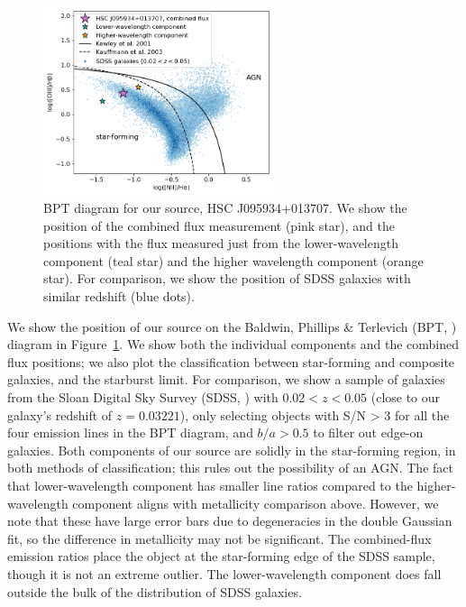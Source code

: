 \begin{figure}
    \centering
    \includegraphics[width=0.6\textwidth]{bpt}
    \caption{BPT diagram for our source, HSC J095934+013707. We show the position of the combined flux measurement (pink star), and the positions with the flux measured just from the lower-wavelength component (teal star) and the higher wavelength component (orange star). For comparison, we show the position of SDSS galaxies with similar redshift (blue dots).}
    \label{fig:bpt}
\end{figure}

We show the position of our source on the Baldwin, Phillips \& Terlevich (BPT, \citealt{Baldwin1981}) diagram in Figure~\ref{fig:bpt}.
We show both the individual components and the combined flux positions; we also plot the \cite{Kauffmann2003} classification between star-forming and composite galaxies, and the \cite{Kewley2001} starburst limit.
For comparison, we show a sample of galaxies from the Sloan Digital Sky Survey (SDSS, \citealt{York2000}) with $0.02<z<0.05$ (close to our galaxy's redshift of $z=0.03221$), only selecting objects with S/N > 3 for all the four emission lines in the BPT diagram, and $b/a > 0.5$ to filter out edge-on galaxies.
Both components of our source are solidly in the star-forming region, in both methods of classification; this rules out the possibility of an AGN.
The fact that lower-wavelength component has smaller line ratios compared to the higher-wavelength component aligns with metallicity comparison above.
However, we note that these have large error bars due to degeneracies in the double Gaussian fit, so the difference in metallicity may not be significant.
The combined-flux emission ratios place the object at the star-forming edge of the SDSS sample, though it is not an extreme outlier.
The lower-wavelength component does fall outside the bulk of the distribution of SDSS galaxies.

